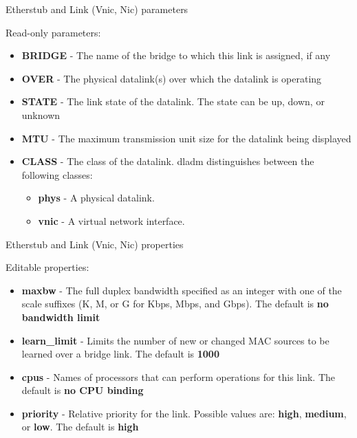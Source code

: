 \documentclass{beamer}
\begin{document}
		\begin{frame}{Etherstub and Link (Vnic, Nic) parameters }

			Read-only parameters:
			
			\begin{itemize}

				\item \textbf{BRIDGE} - The name of the bridge to which this link is assigned, if any
				\item \textbf{OVER} - The physical datalink(s) over which the datalink is operating
				\item \textbf{STATE} - The link state of the datalink. The state can be up, down, or unknown
				\item \textbf{MTU} - The maximum transmission unit size for the datalink being displayed
				\item \textbf{CLASS} - The class of the datalink. dladm distinguishes between the following classes:

					\begin{itemize}
						\item \textbf{phys} - A physical datalink. 
						\item \textbf{vnic} - A virtual network interface. 				
					\end{itemize}			
			\end{itemize}

		\end{frame}

		\begin{frame}{Etherstub and Link (Vnic, Nic) properties }

			Editable properties:
			
			\begin{itemize}

				\item \textbf{maxbw} - The full duplex bandwidth specified as an integer with one of the scale suffixes (K, M, or G for Kbps, Mbps, and Gbps). The default is \textbf{no bandwidth limit}
				\item \textbf{learn\_limit} - Limits the number of new or changed MAC sources to be learned over a bridge link. The default is \textbf{1000}
				\item \textbf{cpus} - Names of processors that can perform operations for this link. The default is \textbf{no CPU binding}
				\item \textbf{priority} - Relative priority for the link. Possible values are: \textbf{high}, \textbf{medium}, or \textbf{low}. The default is \textbf{high}
			
			\end{itemize}

		\end{frame}
\end{document}

